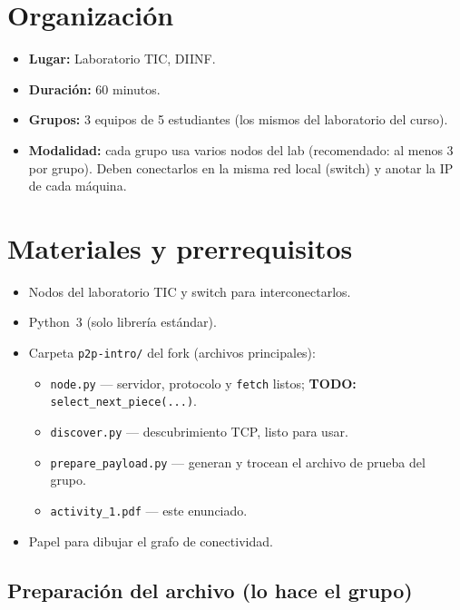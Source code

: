 \documentclass[12pt,a4paper]{article}
\begin{document}
\section{Organización}

\begin{itemize}
    \item \textbf{Lugar:} Laboratorio TIC, DIINF.
    \item \textbf{Duración:} 60 minutos.
    \item \textbf{Grupos:} 3 equipos de 5 estudiantes (los mismos del laboratorio del curso).
    \item \textbf{Modalidad:} cada grupo usa varios nodos del lab (recomendado: al menos 3 por grupo). Deben conectarlos en la misma red local (switch) y anotar la IP de cada máquina.
\end{itemize}

\section{Materiales y prerrequisitos}

\begin{itemize}
    \item Nodos del laboratorio TIC y switch para interconectarlos.
    \item Python~3 (solo librería estándar).
    \item Carpeta \texttt{p2p-intro/} del fork (archivos principales):
    \begin{itemize}
        \item \texttt{node.py} --- servidor, protocolo y \texttt{fetch} listos; \textbf{TODO:} \texttt{select\_next\_piece(...)}.
        \item \texttt{discover.py} --- descubrimiento TCP, listo para usar.
        \item \texttt{prepare\_payload.py} --- generan y trocean el archivo de prueba del grupo.
        \item \texttt{activity\_1.pdf} --- este enunciado.
    \end{itemize}
    \item Papel para dibujar el grafo de conectividad.
\end{itemize}

\subsection{Preparación del archivo (lo hace el grupo)}
\end{document}
